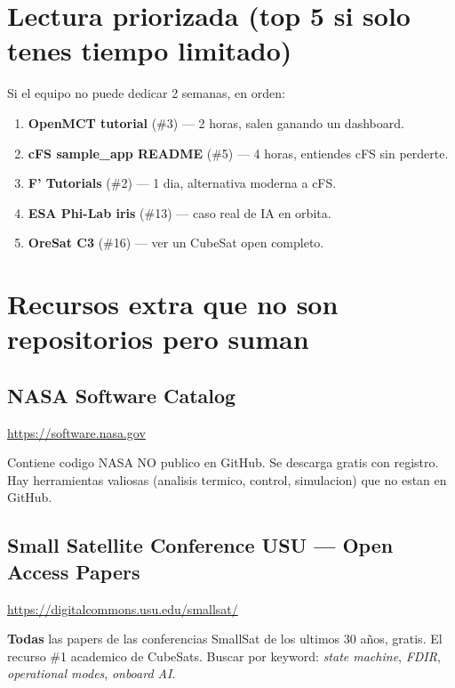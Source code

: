 \documentclass[11pt,a4paper,oneside]{report}
\begin{document}
\chapter{Lectura priorizada (top 5 si solo tenes tiempo limitado)}

Si el equipo no puede dedicar 2 semanas, en orden:

\begin{enumerate}[leftmargin=2em]
  \item \textbf{OpenMCT tutorial} (\#3) --- 2 horas, salen ganando un dashboard.
  \item \textbf{cFS sample\_app README} (\#5) --- 4 horas, entiendes cFS sin perderte.
  \item \textbf{F' Tutorials} (\#2) --- 1 dia, alternativa moderna a cFS.
  \item \textbf{ESA Phi-Lab iris} (\#13) --- caso real de IA en orbita.
  \item \textbf{OreSat C3} (\#16) --- ver un CubeSat open completo.
\end{enumerate}

\chapter{Recursos extra que no son repositorios pero suman}

\section{NASA Software Catalog}

\url{https://software.nasa.gov}

Contiene codigo NASA NO publico en GitHub. Se descarga gratis con
registro. Hay herramientas valiosas (analisis termico, control,
simulacion) que no estan en GitHub.

\section{Small Satellite Conference USU --- Open Access Papers}

\url{https://digitalcommons.usu.edu/smallsat/}

\textbf{Todas} las papers de las conferencias SmallSat de los ultimos 30
años, gratis. El recurso \#1 academico de CubeSats. Buscar por keyword:
\textit{state machine}, \textit{FDIR}, \textit{operational modes},
\textit{onboard AI}.
\end{document}
